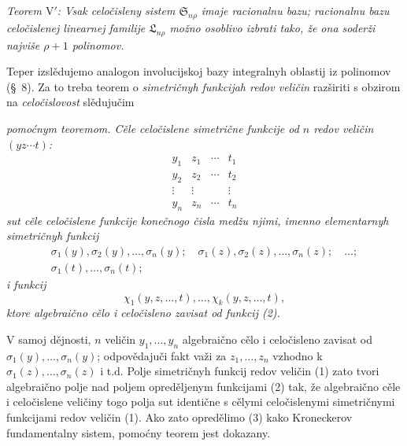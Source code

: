 \documentclass[11pt]{article}
\providecommand{\Ssys}{\mathfrak{S}}
\providecommand{\Lsys}{\mathfrak{L}}
\begin{document}
{\itshape Teorem $\mathrm{V}'$: Vsak celočisleny sistem $\Ssys_{n\rho}$ imaje racionalnu bazu; racionalnu bazu celočislenej linearnej familije $\Lsys_{n\rho}$ možno osoblivo izbrati tako, že ona soderži najviše $\rho+1$ polinomov.}

Teper izslědujemo analogon involucijskoj bazy integralnyh oblastij iz polinomov (\S\ 8). Za to treba teorem o {\itshape simetričnyh funkcijah redov veličin} razširiti s obzirom na {\itshape celočislovost} slědujučim

{\itshape pomoćnym teoremom. Cěle celočislene simetrične funkcije od $n$ redov veličin $(yz\cdots t)$:}
\begin{equation}
\begin{array}{cccc}
  y_1&z_1&\cdots&t_1\\
  y_2&z_2&\cdots&t_2\\
  \vdots&\vdots&&\vdots\\
  y_n&z_n&\cdots&t_n
\end{array}
\tag{1}
\end{equation}
{\itshape sut cěle celočislene funkcije konečnogo čisla medžu njimi, imenno elementarnyh simetričnyh funkcij}
\begin{equation}
\begin{gathered}
  \sigma_1(y),\sigma_2(y),\ldots,\sigma_n(y);\quad
  \sigma_1(z),\sigma_2(z),\ldots,\sigma_n(z);\quad\ldots;\\
  \sigma_1(t),\ldots,\sigma_n(t);
\end{gathered}
\tag{2}
\end{equation}
{\itshape i funkcij}
\begin{equation}
  \chi_1(y,z,\ldots,t),\ldots,\chi_k(y,z,\ldots,t),
\tag{3}
\end{equation}
{\itshape ktore algebraično cělo i celočisleno zavisat od funkcij (2).}

V samoj dějnosti, $n$ veličin $y_1,\ldots,y_n$ algebraično cělo i celočisleno zavisat od $\sigma_1(y),\ldots,\sigma_n(y)$; odpovědajuči fakt važi za $z_1,\ldots,z_n$ vzhodno k $\sigma_1(z),\ldots,\sigma_n(z)$ i t.d. Polje simetričnyh funkcij redov veličin (1) zato tvori algebraično polje nad poljem opreděljenym funkcijami (2) tak, že algebraično cěle i celočislene veličiny togo polja sut identične s cělymi celočislenymi simetričnymi funkcijami redov veličin (1). Ako zato opredělimo (3) kako Kroneckerov fundamentalny sistem, pomoćny teorem jest dokazany.
\end{document}
